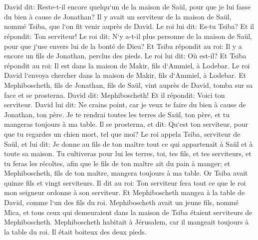 \chapter{}

\verse David dit: Reste-t-il encore quelqu`un de la maison de Saül, pour que je lui fasse du bien à cause de Jonathan? 
\verse Il y avait un serviteur de la maison de Saül, nommé Tsiba, que l`on fit venir auprès de David. Le roi lui dit: Es-tu Tsiba? Et il répondit: Ton serviteur! 
\verse Le roi dit: N`y a-t-il plus personne de la maison de Saül, pour que j`use envers lui de la bonté de Dieu? Et Tsiba répondit au roi: Il y a encore un fils de Jonathan, perclus des pieds. 
\verse Le roi lui dit: Où est-il? Et Tsiba répondit au roi: Il est dans la maison de Makir, fils d`Ammiel, à Lodebar. 
\verse Le roi David l`envoya chercher dans la maison de Makir, fils d`Ammiel, à Lodebar. 
\verse Et Mephiboscheth, fils de Jonathan, fils de Saül, vint auprès de David, tomba sur sa face et se prosterna. David dit: Mephiboscheth! Et il répondit: Voici ton serviteur. 
\verse David lui dit: Ne crains point, car je veux te faire du bien à cause de Jonathan, ton père. Je te rendrai toutes les terres de Saül, ton père, et tu mangeras toujours à ma table. 
\verse Il se prosterna, et dit: Qu`est ton serviteur, pour que tu regardes un chien mort, tel que moi? 
\verse Le roi appela Tsiba, serviteur de Saül, et lui dit: Je donne au fils de ton maître tout ce qui appartenait à Saül et à toute sa maison. 
\verse Tu cultiveras pour lui les terres, toi, tes fils, et tes serviteurs, et tu feras les récoltes, afin que le fils de ton maître ait du pain à manger; et Mephiboscheth, fils de ton maître, mangera toujours à ma table. Or Tsiba avait quinze fils et vingt serviteurs. 
\verse Il dit au roi: Ton serviteur fera tout ce que le roi mon seigneur ordonne à son serviteur. Et Mephiboscheth mangea à la table de David, comme l`un des fils du roi. 
\verse Mephiboscheth avait un jeune fils, nommé Mica, et tous ceux qui demeuraient dans la maison de Tsiba étaient serviteurs de Mephiboscheth. 
\verse Mephiboscheth habitait à Jérusalem, car il mangeait toujours à la table du roi. Il était boiteux des deux pieds. 

\chapter{}

